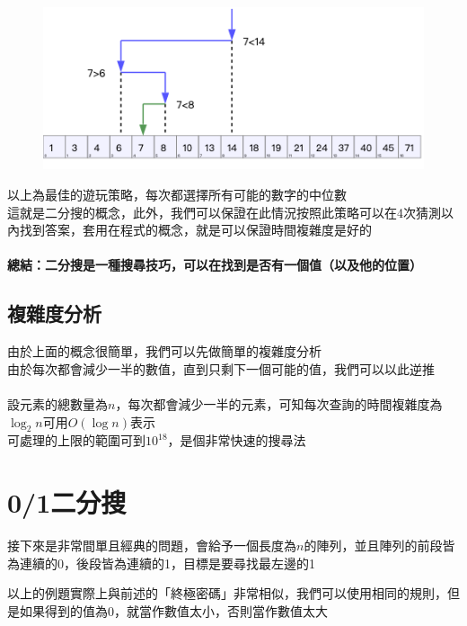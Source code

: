 \documentclass[12pt]{article}
\begin{document}
    \begin{figure}[h]
        \centering
        \includegraphics{resource/binary_search_example.png}
    \end{figure}

    \noindent
    以上為最佳的遊玩策略，每次都選擇所有可能的數字的中位數\\
    這就是二分搜的概念，此外，我們可以保證在此情況按照此策略可以在4次猜測以內找到答案，套用在程式的概念，就是可以保證時間複雜度是好的\\\\
    \noindent\textbf{總結：二分搜是一種搜尋技巧，可以在找到是否有一個值（以及他的位置）}

    \subsection{複雜度分析}
    由於上面的概念很簡單，我們可以先做簡單的複雜度分析\\
    由於每次都會減少一半的數值，直到只剩下一個可能的值，我們可以以此逆推\\\\

    設元素的總數量為$n$，每次都會減少一半的元素，可知每次查詢的時間複雜度為$\log_2{n}$可用$O(\log{n})$表示\\
    可處理的上限的範圍可到$10^{18}$，是個非常快速的搜尋法
    \pagebreak

    \section{0/1二分搜}
    接下來是非常間單且經典的問題，會給予一個長度為$n$的陣列，並且陣列的前段皆為連續的0，後段皆為連續的1，目標是要尋找最左邊的1
    

    \noindent
    以上的例題實際上與前述的「終極密碼」非常相似，我們可以使用相同的規則，但是如果得到的值為0，就當作數值太小，否則當作數值太大
    
\end{document}
